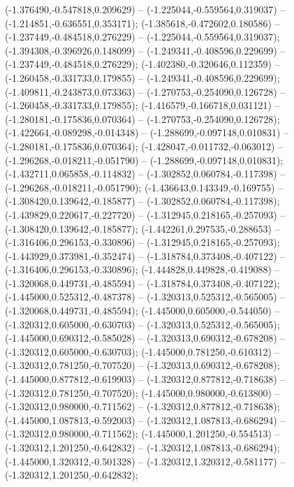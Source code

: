  (-1.376490,-0.547818,0.209629) -- (-1.225044,-0.559564,0.319037) -- (-1.214851,-0.636551,0.353171);
 (-1.385618,-0.472602,0.180586) -- (-1.237449,-0.484518,0.276229) -- (-1.225044,-0.559564,0.319037);
 (-1.394308,-0.396926,0.148099) -- (-1.249341,-0.408596,0.229699) -- (-1.237449,-0.484518,0.276229);
 (-1.402380,-0.320646,0.112359) -- (-1.260458,-0.331733,0.179855) -- (-1.249341,-0.408596,0.229699);
 (-1.409811,-0.243873,0.073363) -- (-1.270753,-0.254090,0.126728) -- (-1.260458,-0.331733,0.179855);
 (-1.416579,-0.166718,0.031121) -- (-1.280181,-0.175836,0.070364) -- (-1.270753,-0.254090,0.126728);
 (-1.422664,-0.089298,-0.014348) -- (-1.288699,-0.097148,0.010831) -- (-1.280181,-0.175836,0.070364);
 (-1.428047,-0.011732,-0.063012) -- (-1.296268,-0.018211,-0.051790) -- (-1.288699,-0.097148,0.010831);
 (-1.432711,0.065858,-0.114832) -- (-1.302852,0.060784,-0.117398) -- (-1.296268,-0.018211,-0.051790);
 (-1.436643,0.143349,-0.169755) -- (-1.308420,0.139642,-0.185877) -- (-1.302852,0.060784,-0.117398);
 (-1.439829,0.220617,-0.227720) -- (-1.312945,0.218165,-0.257093) -- (-1.308420,0.139642,-0.185877);
 (-1.442261,0.297535,-0.288653) -- (-1.316406,0.296153,-0.330896) -- (-1.312945,0.218165,-0.257093);
 (-1.443929,0.373981,-0.352474) -- (-1.318784,0.373408,-0.407122) -- (-1.316406,0.296153,-0.330896);
 (-1.444828,0.449828,-0.419088) -- (-1.320068,0.449731,-0.485594) -- (-1.318784,0.373408,-0.407122);
 (-1.445000,0.525312,-0.487378) -- (-1.320313,0.525312,-0.565005) -- (-1.320068,0.449731,-0.485594);
 (-1.445000,0.605000,-0.544050) -- (-1.320312,0.605000,-0.630703) -- (-1.320313,0.525312,-0.565005);
 (-1.445000,0.690312,-0.585028) -- (-1.320313,0.690312,-0.678208) -- (-1.320312,0.605000,-0.630703);
 (-1.445000,0.781250,-0.610312) -- (-1.320312,0.781250,-0.707520) -- (-1.320313,0.690312,-0.678208);
 (-1.445000,0.877812,-0.619903) -- (-1.320312,0.877812,-0.718638) -- (-1.320312,0.781250,-0.707520);
 (-1.445000,0.980000,-0.613800) -- (-1.320312,0.980000,-0.711562) -- (-1.320312,0.877812,-0.718638);
 (-1.445000,1.087813,-0.592003) -- (-1.320312,1.087813,-0.686294) -- (-1.320312,0.980000,-0.711562);
 (-1.445000,1.201250,-0.554513) -- (-1.320312,1.201250,-0.642832) -- (-1.320312,1.087813,-0.686294);
 (-1.445000,1.320312,-0.501328) -- (-1.320312,1.320312,-0.581177) -- (-1.320312,1.201250,-0.642832);
